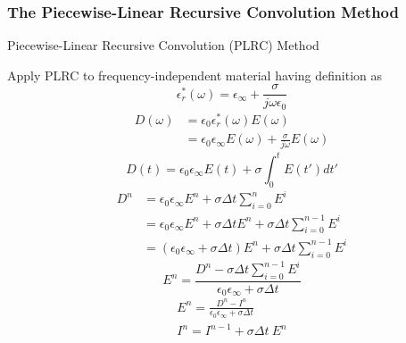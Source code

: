 \subsubsection{The Piecewise-Linear Recursive Convolution Method}
Piecewise-Linear Recursive Convolution (PLRC) Method

Apply PLRC to frequency-independent material having definition as
\begin{displaymath}
  \epsilon_r^{*}(\omega) = \epsilon_{\infty} + \frac{\sigma}{j \omega \epsilon_0}
\end{displaymath}
\begin{displaymath}
  \begin{split}
    D(\omega) & = \epsilon_0 \epsilon_r^{*}(\omega) E(\omega)\\
    & = \epsilon_0 \epsilon_{\infty} E(\omega) + \frac{\sigma}{j\omega}E(\omega)
  \end{split}
\end{displaymath}
\begin{displaymath}
  D(t) = \epsilon_0 \epsilon_{\infty}E(t) + \sigma \int_0^t E(t')dt'
\end{displaymath}
\begin{displaymath}
  \begin{split}
    D^n & = \epsilon_0 \epsilon_{\infty} E^n + \sigma \Delta t \sum_{i=0}^{n}E^i\\
    & = \epsilon_0 \epsilon_{\infty} E^n + \sigma \Delta t E^n + \sigma \Delta t \sum_{i=0}^{n-1}E^i\\
    & = (\epsilon_0 \epsilon_{\infty} + \sigma \Delta t) E^n + \sigma \Delta t \sum_{i=0}^{n-1}E^i
  \end{split}
\end{displaymath}
\begin{displaymath}
  E^n = \frac{\displaystyle D^n - \sigma \Delta t \sum_{i=0}^{n-1}E^i}{\epsilon_0 \epsilon_{\infty} + \sigma \Delta t}
\end{displaymath}
\begin{gather*}
  E^n = \frac{D^n - I^n}{\epsilon_0 \epsilon_{\infty} + \sigma \Delta t}\\
  I^n = I^{n-1} + \sigma \Delta t\ E^n
\end{gather*}

